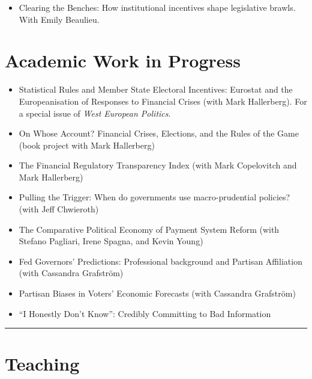 \documentclass[a4paper]{article}
\begin{document}
{{\begin{itemize}
    \item Clearing the Benches: How institutional incentives shape legislative brawls. With Emily Beaulieu.

\end{itemize}

\section*{Academic Work in Progress}

\begin{itemize}

    \item Statistical Rules and Member State Electoral Incentives: Eurostat and the Europeanisation of Responses to Financial Crises (with Mark Hallerberg). For a special issue of \emph{West European Politics}.

    \item On Whose Account? Financial Crises, Elections, and the Rules of the Game (book project with Mark Hallerberg)

    \item The Financial Regulatory Transparency Index (with Mark Copelovitch and Mark Hallerberg)

    \item Pulling the Trigger: When do governments use macro-prudential policies? (with Jeff Chwieroth)

    \item The Comparative Political Economy of Payment System Reform (with Stefano Pagliari, Irene Spagna, and Kevin Young)

    \item Fed Governors' Predictions: Professional background and Partisan Affiliation (with Cassandra Grafstr\"{o}m)

    \item Partisan Biases in Voters' Economic Forecasts (with Cassandra Grafstr\"{o}m)

    \item ``I Honestly Don't Know'': Credibly Committing to Bad Information

\end{itemize}


\vspace{0.25cm}
\medskip\hrule height 1pt
\vspace{0.5cm}

\section*{Teaching}

}}
\end{document}
